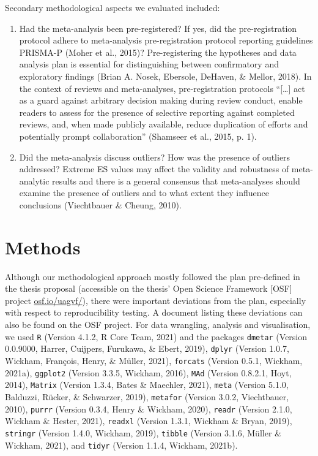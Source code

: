\documentclass[
  man,floatsintext]{apa6}
\providecommand{\tightlist}{%
  \setlength{\itemsep}{0pt}\setlength{\parskip}{0pt}}
\begin{document}
Secondary methodological aspects we evaluated included:

\begin{enumerate}
\def\labelenumi{\arabic{enumi}.}
\tightlist
\item
  Had the meta-analysis been pre-registered? If yes, did the pre-registration protocol adhere to meta-analysis pre-registration protocol reporting guidelines PRISMA-P (Moher et al., 2015)? Pre-registering the hypotheses and data analysis plan is essential for distinguishing between confirmatory and exploratory findings (Brian A. Nosek, Ebersole, DeHaven, \& Mellor, 2018). In the context of reviews and meta-analyses, pre-registration protocols ``{[}\ldots{]} act as a guard against arbitrary decision making during review conduct, enable readers to assess for the presence of selective reporting against completed reviews, and, when made publicly available, reduce duplication of efforts and potentially prompt collaboration'' (Shamseer et al., 2015, p. 1).
\item
  Did the meta-analysis discuss outliers? How was the presence of outliers addressed?
  Extreme ES values may affect the validity and robustness of meta-analytic results and there is a general consensus that meta-analyses should examine the presence of outliers and to what extent they influence conclusions (Viechtbauer \& Cheung, 2010).
  \vspace{-6mm}
\end{enumerate}

\hypertarget{methods}{%
\section{Methods}\label{methods}}

Although our methodological approach mostly followed the plan pre-defined in the thesis proposal (accessible on the thesis' Open Science Framework {[}OSF{]} project \href{https://osf.io/uagvf/}{osf.io/uagvf/}), there were important deviations from the plan, especially with respect to reproducibility testing. A document listing these deviations can also be found on the OSF project. For data wrangling, analysis and visualisation, we used \texttt{R} (Version 4.1.2, R Core Team, 2021) and the packages \texttt{dmetar} (Version 0.0.9000, Harrer, Cuijpers, Furukawa, \& Ebert, 2019), \texttt{dplyr} (Version 1.0.7, Wickham, François, Henry, \& Müller, 2021), \texttt{forcats} (Version 0.5.1, Wickham, 2021a), \texttt{ggplot2} (Version 3.3.5, Wickham, 2016), \texttt{MAd} (Version 0.8.2.1, Hoyt, 2014), \texttt{Matrix} (Version 1.3.4, Bates \& Maechler, 2021), \texttt{meta} (Version 5.1.0, Balduzzi, Rücker, \& Schwarzer, 2019), \texttt{metafor} (Version 3.0.2, Viechtbauer, 2010), \texttt{purrr} (Version 0.3.4, Henry \& Wickham, 2020), \texttt{readr} (Version 2.1.0, Wickham \& Hester, 2021), \texttt{readxl} (Version 1.3.1, Wickham \& Bryan, 2019), \texttt{stringr} (Version 1.4.0, Wickham, 2019), \texttt{tibble} (Version 3.1.6, Müller \& Wickham, 2021), and \texttt{tidyr} (Version 1.1.4, Wickham, 2021b).
\end{document}
